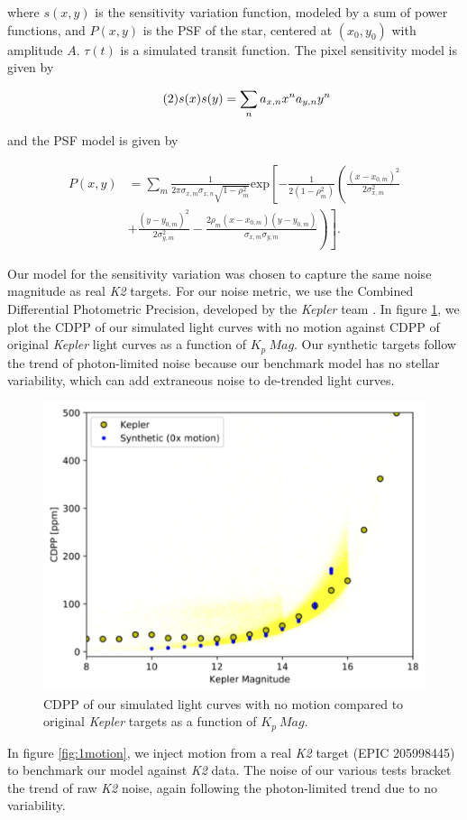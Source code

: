 \documentclass[12pt,preprint]{aastex}
\begin{document}
where $s(x,y)$ is the sensitivity variation function, modeled by a sum of power functions, and $P(x,y)$ is the PSF of the star, centered at $(x_0,y_0)$ with amplitude $A$. $\tau (t)$ is a simulated transit function. The pixel sensitivity model is given by

\[
\tag{2}
s(x)s(y) = \sum_n a_{x,n}x^na_{y,n}y^n \\
\]

and the PSF model is given by

\[
\tag{3}
\begin{split}
P(x,y) & = \sum_m \frac{1}{2\pi\sigma_{x,m}\sigma_{x,n}\sqrt{1-\rho_m^2}} \text{exp}\left[ -\frac{1}{2(1-\rho_m^2)} \left( \frac{(x-x_{0,m})^2}{2\sigma_{x,m}^2} \right. \right. \\
			 & \left. \left. + \frac{(y-y_{0,m})^2}{2\sigma_{y,m}^2} - \frac{2\rho_m  (x-x_{0,m})(y-y_{0,m})}{\sigma_{x,m}\sigma_{y,m}} \right) \right].
\end{split}
\]

Our model for the sensitivity variation was chosen to capture the same noise magnitude as real \textit{K2} targets. For our noise metric, we use the Combined Differential Photometric Precision, developed by the \textit{Kepler} team \citep{2012PASP..124.1279C}. In figure \ref{fig:nomotion}, we plot the CDPP of our simulated light curves with no motion against CDPP of original \textit{Kepler} light curves as a function of $K_p\ Mag$. Our synthetic targets follow the trend of photon-limited noise because our benchmark model has no stellar variability, which can add extraneous noise to de-trended light curves.

\begin{figure}[h]
	\centering
	\includegraphics[width=.5\linewidth]{nomotion.png}
	\caption{CDPP of our simulated light curves with no motion compared to original \textit{Kepler} targets as a function of $K_p\ Mag$.}
	\label{fig:nomotion}
\end{figure}

In figure \ref{fig:1motion}, we inject motion from a real \textit{K2} target (EPIC 205998445) to benchmark our model against \textit{K2} data. The noise of our various tests bracket the trend of raw \textit{K2} noise, again following the photon-limited trend due to no variability.
\end{document}

